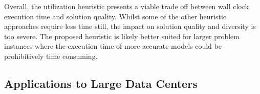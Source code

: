 \begin{table}
    \caption{Median wall clock time (s) as a multiple of the median wall clock time of our proposed model averaged over all topologies.}
    \label{tbl:model_time_multiple}

    \centering

\end{table}

Overall, the utilization heuristic presents a viable trade off between wall clock execution time and solution quality. Whilst some of the other heuristic approaches require less time still, the impact on solution quality and diversity is too severe. The proposed heuristic is likely better suited for larger problem instances where the execution time of more accurate models could be prohibitively time consuming.

\subsection{Applications to Large Data Centers}
